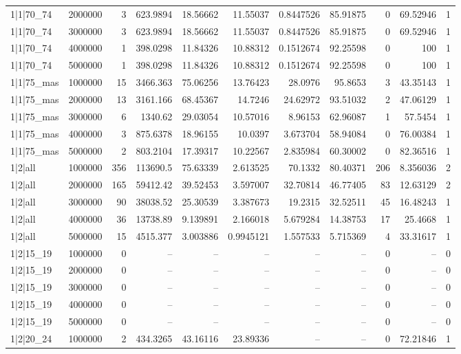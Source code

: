 \begin{tabular}{lrrrrrrrrrr}
1|1|70\_74 & 2000000 & 3 & 623.9894 & 18.56662 & 11.55037 & 0.8447526 & 85.91875 & 0 & 69.52946 & 1 \\
1|1|70\_74 & 3000000 & 3 & 623.9894 & 18.56662 & 11.55037 & 0.8447526 & 85.91875 & 0 & 69.52946 & 1 \\
1|1|70\_74 & 4000000 & 1 & 398.0298 & 11.84326 & 10.88312 & 0.1512674 & 92.25598 & 0 & 100 & 1 \\
1|1|70\_74 & 5000000 & 1 & 398.0298 & 11.84326 & 10.88312 & 0.1512674 & 92.25598 & 0 & 100 & 1 \\
1|1|75\_mas & 1000000 & 15 & 3466.363 & 75.06256 & 13.76423 & 28.0976 & 95.8653 & 3 & 43.35143 & 1 \\
1|1|75\_mas & 2000000 & 13 & 3161.166 & 68.45367 & 14.7246 & 24.62972 & 93.51032 & 2 & 47.06129 & 1 \\
1|1|75\_mas & 3000000 & 6 & 1340.62 & 29.03054 & 10.57016 & 8.96153 & 62.96087 & 1 & 57.5454 & 1 \\
1|1|75\_mas & 4000000 & 3 & 875.6378 & 18.96155 & 10.0397 & 3.673704 & 58.94084 & 0 & 76.00384 & 1 \\
1|1|75\_mas & 5000000 & 2 & 803.2104 & 17.39317 & 10.22567 & 2.835984 & 60.30002 & 0 & 82.36516 & 1 \\
1|2|all & 1000000 & 356 & 113690.5 & 75.63339 & 2.613525 & 70.1332 & 80.40371 & 206 & 8.356036 & 2 \\
1|2|all & 2000000 & 165 & 59412.42 & 39.52453 & 3.597007 & 32.70814 & 46.77405 & 83 & 12.63129 & 2 \\
1|2|all & 3000000 & 90 & 38038.52 & 25.30539 & 3.387673 & 19.2315 & 32.52511 & 45 & 16.48243 & 1 \\
1|2|all & 4000000 & 36 & 13738.89 & 9.139891 & 2.166018 & 5.679284 & 14.38753 & 17 & 25.4668 & 1 \\
1|2|all & 5000000 & 15 & 4515.377 & 3.003886 & 0.9945121 & 1.557533 & 5.715369 & 4 & 33.31617 & 1 \\
1|2|15\_19 & 1000000 & 0 & -- & -- & -- & -- & -- & 0 & -- & 0 \\
1|2|15\_19 & 2000000 & 0 & -- & -- & -- & -- & -- & 0 & -- & 0 \\
1|2|15\_19 & 3000000 & 0 & -- & -- & -- & -- & -- & 0 & -- & 0 \\
1|2|15\_19 & 4000000 & 0 & -- & -- & -- & -- & -- & 0 & -- & 0 \\
1|2|15\_19 & 5000000 & 0 & -- & -- & -- & -- & -- & 0 & -- & 0 \\
1|2|20\_24 & 1000000 & 2 & 434.3265 & 43.16116 & 23.89336 & -- & -- & 0 & 72.21846 & 1 \\

\end{tabular}
